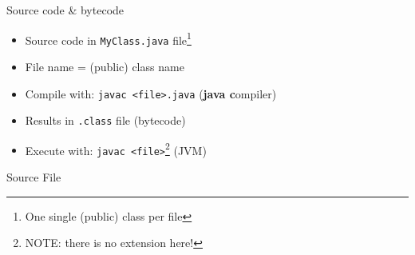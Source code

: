 \documentclass[English,c,%
hyperref={%
    pdftitle={FISA-DE2 OOP in Java},%
    pdfauthor={Muller, Gravier, Laforest, Subercaze},%
    pdfsubject={OOP in Java},%
    pdfkeywords={OOP, Java},%
    colorlinks=true,%
    urlcolor=blue,%
    linkcolor=%
    },%
xcolor={pdftex,svgnames} %
]{beamer}
\begin{document}
\begin{frame}{Source code \& bytecode}
  \begin{itemize}
    \item Source code in \texttt{MyClass.java} file\footnote{One single (public) class per file}
    \medskip
    \item File name = (public) class name
    \medskip
    \item Compile with: \texttt{javac <file>.java} (\textbf{java c}ompiler)
    \medskip
    \item Results in \texttt{.class} file (bytecode)
    \medskip
    \item Execute with: \texttt{javac <file>}\footnote{NOTE: there is no extension here!} (JVM)
  \end{itemize}
\end{frame}

\begin{frame}{Source File}


\end{frame}
\end{document}
